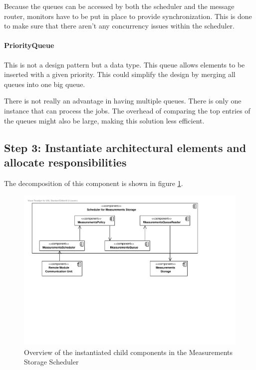 \npar Because the queues can be accessed by both the scheduler and the message
router, monitors have to be put in place to provide synchronization. This is
done to make sure that there aren't any concurrency issues within the scheduler. 

\paragraph{PriorityQueue}

\npar This is not a design pattern but a data type. This queue allows elements
to be inserted with a given priority. This could simplify the design by merging
all queues into one big queue.

\npar There is not really an advantage in having multiple queues. There is only
one instance that can process the jobs. The overhead of comparing the top
entries of the queues might also be large, making this solution less efficient. 

\subsection{Step 3: Instantiate architectural elements and allocate responsibilities}
\label{add:it3/elements}

\npar The decomposition of this component is shown in figure
\ref{fig:it3/elements}. 

\begin{figure}[H]
	\begin{centering}
		\includegraphics[width=\textwidth]{figs/add-it3-elements.pdf}
		\caption{Overview of the instantiated child components in the Measurements
		Storage Scheduler}
		\label{fig:it3/elements}
	\end{centering}
\end{figure}

